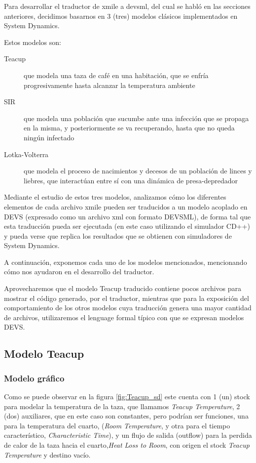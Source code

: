 Para desarrollar el traductor de xmile a devsml, del cual se habló en las secciones anteriores, decidimos basarnos en 3 (tres) modelos clásicos implementados en System Dynamics. 

Estos modelos son: 
\begin{description}
	\item[Teacup] que modela una taza de café en una habitación, que se enfría progresivamente hasta alcanzar la temperatura ambiente
	\item[SIR] 	que modela una población que sucumbe ante una infección que se propaga en la misma, y posteriormente se va recuperando, hasta que no queda ningún infectado
	\item[Lotka-Volterra] que modela el proceso de nacimientos y decesos de un población de linces y liebres, que interactúan entre sí con una dinámica de presa-depredador
\end{description}

Mediante el estudio de estos tres modelos, analizamos cómo los diferentes elementos de cada archivo xmile pueden ser traducidos a un modelo acoplado en DEVS (expresado como un archivo xml con formato DEVSML), de forma tal que esta traducción pueda ser ejecutada (en este caso utilizando el simulador CD++) y pueda verse que replica los resultados que se obtienen con simuladores de System Dynamics.

A continuación, exponemos cada uno de los modelos mencionados, mencionando cómo nos ayudaron en el desarrollo del traductor. 

Aprovecharemos que el modelo Teacup traducido contiene pocos archivos para mostrar el código generado, por el traductor, mientras que para la exposición del comportamiento de los otros modelos cuya traducción genera una mayor cantidad de archivos, utilizaremos el lenguage formal típico con que se expresan modelos DEVS.

\subsection{Modelo Teacup}
\subsubsection{Modelo gráfico}
Como se puede observar en la figura \ref{fig:Teacup_sd} este cuenta con 1 (un) stock para modelar la temperatura de la taza, que llamamos \textit{Teacup Temperature}, 2 (dos) auxiliares, que en este caso son constantes, pero podrían ser funciones, una para la temperatura del cuarto, (\textit{Room Temperature}, y otra para el tiempo característico, \textit{Characteristic Time}), y un flujo de salida (outflow) para la perdida de calor de la taza hacia el cuarto,\textit{Heat Loss to Room}, con origen el stock \textit{Teacup Temperature} y destino vacío. 

